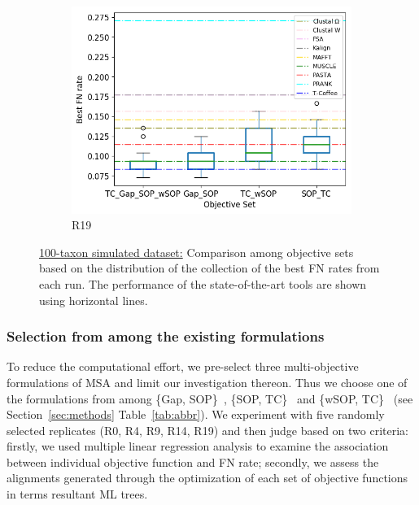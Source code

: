 \begin{figure}[!htbp]
\begin{adjustwidth}{-1cm}{-1cm}
\begin{subfigure}{0.22\textwidth}
		\includegraphics[width=\columnwidth]{Figure/summary/precomputedInit/R19/objset_fnrate_rank}
		\caption{R19}
	\end{subfigure}
	\caption{\underline{100-taxon simulated dataset:} Comparison among objective sets based on the distribution of the collection of the best FN rates from each run. The performance of the state-of-the-art tools are shown using horizontal lines.}
	\label{fig:rank_best_fn_rate}
\end{adjustwidth}
\end{figure}
\subsubsection{Selection from among the existing formulations}
\label{sec:existing_msa_formulation}
To reduce the computational effort, we pre-select three multi-objective formulations of MSA and limit our investigation thereon. Thus we choose one of the formulations from among \{Gap, SOP\}~\citep{abbasi2015local}, \{SOP, TC\}~\citep{da2010alineaga} and \{wSOP, TC\}~\citep{rubio2016bee, rubio2016hybrid} (see Section~\ref{sec:methods} Table~\ref{tab:abbr}). We experiment with five randomly selected replicates (R0, R4, R9, R14, R19) and then judge based on two criteria: firstly, we used multiple linear regression analysis to examine the association between individual objective function and FN rate; secondly, we assess the alignments generated through the optimization of each set of objective functions in terms resultant ML trees. 

